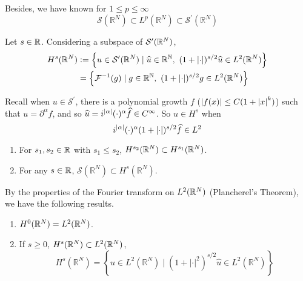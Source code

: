 \noindent Besides, we have known for $1 \leq p \leq \infty$
\begin{equation*}
	\mathcal{S}\left(\mathbb{R}^N\right) \subset L^p\left(\mathbb{R}^N\right) \subset \mathcal{S}^{\prime}\left(\mathbb{R}^N\right)
\end{equation*}

\begin{defn}
	Let $s \in \mathbb{R}$. Considering a subspace of $\mathcal{S}^\prime(\mathbb{R}^N)$,
	\begin{equation*}
		\begin{aligned}
			H^s(\mathbb{R}^N) &\vcentcolon= \left\{u \in \mathcal{S}^\prime(\mathbb{R}^N) \mid \widehat{u} \in \mathbb{\mathbb{R}^N},~(1+\left\lvert\cdot\right\lvert)^{s/2}\widehat{u} \in L^2(\mathbb{R}^N)\right\} \\
			&= \left\{\mathcal{F}^{-1}(g) \mid g \in \mathbb{\mathbb{R}^N},~(1+\left\lvert\cdot\right\lvert)^{s/2}g \in L^2(\mathbb{R}^N)\right\}
		\end{aligned}
	\end{equation*}
\end{defn}
\begin{rmk}
	Recall when $u \in \mathcal{S}^\prime$, there is a polynomial growth $f$ ($\left\lvert f(x)\right\lvert \leq C(1+\left\lvert x\right\lvert^k)$) such that $u = \partial^\alpha f$, and so $\widehat{u} = i^{\left\lvert\alpha\right\lvert}(\cdot)^\alpha \widehat{f} \in C^\infty$. So $u \in H^s$ when
	\begin{equation*}
		i^{\left\lvert\alpha\right\lvert}(\cdot)^\alpha(1+\left\lvert\cdot\right\lvert)^{s/2} \widehat{f} \in L^2
	\end{equation*}
\end{rmk}
\begin{rmk}
	\begin{enumerate}[label=(\arabic{*})]
		\item For $s_1,s_2 \in \mathbb{R}$ with $s_1 \leq s_2$, $H^{s_2}(\mathbb{R}^N) \subset H^{s_1}(\mathbb{R}^N)$.
		\item For any $s \in \mathbb{R}$, $\mathcal{S}\left(\mathbb{R}^N\right) \subset H^s\left(\mathbb{R}^N\right)$.
	\end{enumerate}
\end{rmk}
\begin{rmk}
	By the properties of the Fourier transform on $L^2(\mathbb{R}^N)$ (Plancherel's Theorem), we have the following results.
	\begin{enumerate}[label=(\arabic{*})]
		\item $H^0(\mathbb{R}^N) = L^2(\mathbb{R}^N)$.
		\item If $s \geq 0$, $H^s(\mathbb{R}^N) \subset L^2(\mathbb{R}^N)$,
		\begin{equation*}
			H^s\left(\mathbb{R}^N\right)=\left\{u \in L^2\left(\mathbb{R}^N\right) \mid\left(1+|\cdot|^2\right)^{s / 2} \widehat{u} \in L^2\left(\mathbb{R}^N\right)\right\}
		\end{equation*}
	\end{enumerate}
\end{rmk}
